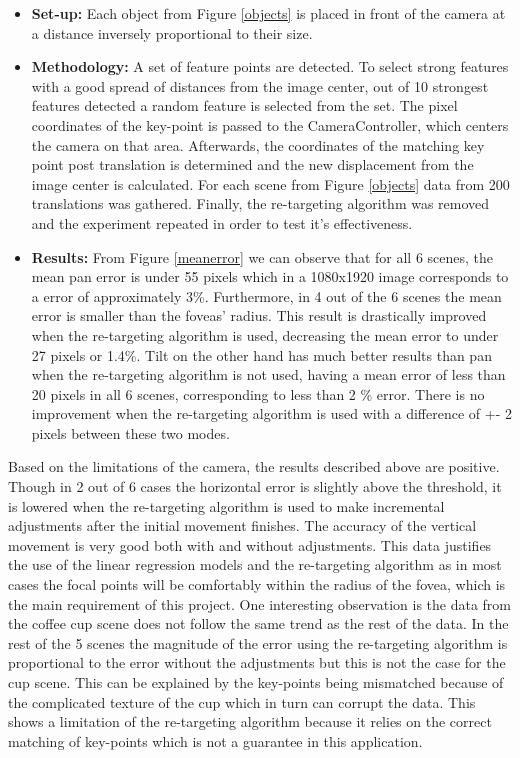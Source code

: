 \documentclass{l4proj}
\begin{document}
\begin{itemize}
    \item \textbf{Set-up:} Each object from Figure \ref{objects} is placed in front of the camera at a distance inversely proportional to their size. 
    
    \item \textbf{Methodology:} A set of feature points are detected. To select strong features with a good spread of distances from the image center, out of 10 strongest features detected a random feature is selected from the set. The pixel coordinates of the key-point is passed to the CameraController, which centers the camera on that area. Afterwards, the coordinates of the matching key point post translation is determined and the new displacement from the image center is calculated. For each scene from Figure \ref{objects} data from 200 translations was gathered. Finally, the re-targeting algorithm was removed and the experiment repeated in order to test it's effectiveness.
    
    
    \item \textbf{Results:}  From Figure \ref{meanerror} we can observe that for all 6 scenes, the mean pan error is under 55 pixels which in a 1080x1920 image corresponds to a error of approximately 3\%. Furthermore, in 4 out of the 6 scenes the mean error is smaller than the foveas' radius. This result is drastically improved when the re-targeting algorithm is used, decreasing the mean error to under 27 pixels or 1.4\%. Tilt on the other hand has much better results than pan when the re-targeting algorithm is not used, having a mean error of less than 20 pixels in all 6 scenes, corresponding to less than 2 \% error. There is no improvement when the re-targeting algorithm is used with a difference of +- 2 pixels between these two modes. 
    
\end{itemize}

Based on the limitations of the camera, the results described above are positive. Though in 2 out of 6 cases the horizontal error is slightly above the threshold, it is lowered when the re-targeting algorithm is used to make incremental adjustments after the initial movement finishes. The accuracy of the vertical movement is very good both with and without adjustments. This data justifies the use of the linear regression models and the re-targeting algorithm as in most cases the focal points will be comfortably within the radius of the fovea, which is the main requirement of this project. One interesting observation is the data from the coffee cup scene does not follow the same trend as the rest of the data. In the rest of the 5 scenes the magnitude of the error using the re-targeting algorithm is proportional to the error without the adjustments but this is not the case for the cup scene. This can be explained by the key-points being mismatched because of the complicated texture of the cup which in turn can corrupt the data. This shows a limitation of the re-targeting algorithm because it relies on the correct matching of key-points which is not a guarantee in this application. 
\end{document}
